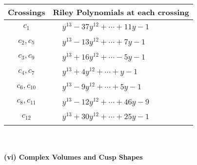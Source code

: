 \documentclass[1p]{elsarticle_modified}
\theoremstyle{definition}
\begin{document}
\begin{tabular}{m{50pt}|m{274pt}}
Crossings & \hspace{64pt}Riley Polynomials at each crossing \\
\hline $$\begin{aligned}c_{1}\end{aligned}$$&$\begin{aligned}
&y^{13}-37 y^{12}+\cdots+11 y-1
\end{aligned}$\\
\hline $$\begin{aligned}c_{2},c_{5}\end{aligned}$$&$\begin{aligned}
&y^{13}-13 y^{12}+\cdots+7 y-1
\end{aligned}$\\
\hline $$\begin{aligned}c_{3},c_{9}\end{aligned}$$&$\begin{aligned}
&y^{13}+16 y^{12}+\cdots-5 y-1
\end{aligned}$\\
\hline $$\begin{aligned}c_{4},c_{7}\end{aligned}$$&$\begin{aligned}
&y^{13}+4 y^{12}+\cdots+y-1
\end{aligned}$\\
\hline $$\begin{aligned}c_{6},c_{10}\end{aligned}$$&$\begin{aligned}
&y^{13}-9 y^{12}+\cdots+5 y-1
\end{aligned}$\\
\hline $$\begin{aligned}c_{8},c_{11}\end{aligned}$$&$\begin{aligned}
&y^{13}-12 y^{12}+\cdots+46 y-9
\end{aligned}$\\
\hline $$\begin{aligned}c_{12}\end{aligned}$$&$\begin{aligned}
&y^{13}+30 y^{12}+\cdots+25 y-1
\end{aligned}$\\
\hline
\end{tabular}\\~\\
\newpage\flushleft \textbf{(vi) Complex Volumes and Cusp Shapes}
\end{document}
